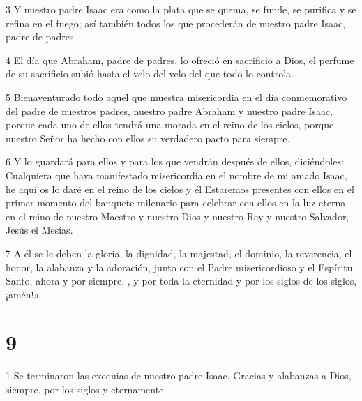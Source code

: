 \par 3 Y nuestro padre Isaac era como la plata que se quema, se funde, se purifica y se refina en el fuego; así también todos los que procederán de nuestro padre Isaac, padre de padres.

\par 4 El día que Abraham, padre de padres, lo ofreció en sacrificio a Dios, el perfume de su sacrificio subió hasta el velo del velo del que todo lo controla.

\par 5 Bienaventurado todo aquel que muestra misericordia en el día conmemorativo del padre de nuestros padres, nuestro padre Abraham y nuestro padre Isaac, porque cada uno de ellos tendrá una morada en el reino de los cielos, porque nuestro Señor ha hecho con ellos su verdadero pacto para siempre.

\par 6 Y lo guardará para ellos y para los que vendrán después de ellos, diciéndoles: Cualquiera que haya manifestado misericordia en el nombre de mi amado Isaac, he aquí os lo daré en el reino de los cielos y él Estaremos presentes con ellos en el primer momento del banquete milenario para celebrar con ellos en la luz eterna en el reino de nuestro Maestro y nuestro Dios y nuestro Rey y nuestro Salvador, Jesús el Mesías.

\par 7 A él se le deben la gloria, la dignidad, la majestad, el dominio, la reverencia, el honor, la alabanza y la adoración, junto con el Padre misericordioso y el Espíritu Santo, ahora y por siempre. , y por toda la eternidad y por los siglos de los siglos, ¡amén!»

\chapter{9}

\par 1 Se terminaron las exequias de nuestro padre Isaac. Gracias y alabanzas a Dios, siempre, por los siglos y eternamente.



